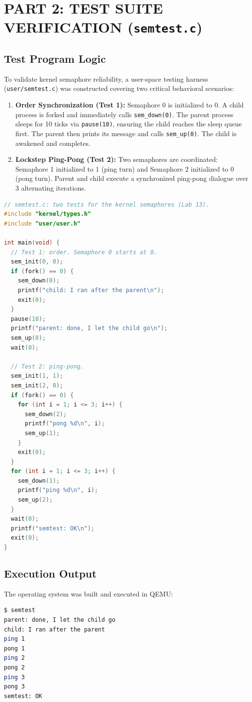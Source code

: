 \documentclass[12pt,a4paper]{report}
\numberwithin{equation}{chapter}
\numberwithin{figure}{chapter}
\numberwithin{table}{chapter}
\begin{document}
\chapter{PART 2: TEST SUITE VERIFICATION (\texttt{semtest.c})}

\section{Test Program Logic}
To validate kernel semaphore reliability, a user-space testing harness (\texttt{user/semtest.c}) was constructed covering two critical behavioral scenarios:
\begin{enumerate}
    \item \textbf{Order Synchronization (Test 1):} Semaphore 0 is initialized to 0. A child process is forked and immediately calls \texttt{sem\_down(0)}. The parent process sleeps for 10 ticks via \texttt{pause(10)}, ensuring the child reaches the sleep queue first. The parent then prints its message and calls \texttt{sem\_up(0)}. The child is awakened and completes.
    \item \textbf{Lockstep Ping-Pong (Test 2):} Two semaphores are coordinated: Semaphore 1 initialized to 1 (ping turn) and Semaphore 2 initialized to 0 (pong turn). Parent and child execute a synchronized ping-pong dialogue over 3 alternating iterations.
\end{enumerate}

\begin{lstlisting}[language=C]
// semtest.c: two tests for the kernel semaphores (Lab 13).
#include "kernel/types.h"
#include "user/user.h"

int main(void) {
  // Test 1: order. Semaphore 0 starts at 0.
  sem_init(0, 0);
  if (fork() == 0) {
    sem_down(0);
    printf("child: I ran after the parent\n");
    exit(0);
  }
  pause(10);
  printf("parent: done, I let the child go\n");
  sem_up(0);
  wait(0);

  // Test 2: ping-pong.
  sem_init(1, 1);
  sem_init(2, 0);
  if (fork() == 0) {
    for (int i = 1; i <= 3; i++) {
      sem_down(2);
      printf("pong %d\n", i);
      sem_up(1);
    }
    exit(0);
  }
  for (int i = 1; i <= 3; i++) {
    sem_down(1);
    printf("ping %d\n", i);
    sem_up(2);
  }
  wait(0);
  printf("semtest: OK\n");
  exit(0);
}
\end{lstlisting}

\section{Execution Output}
The operating system was built and executed in QEMU:
\begin{lstlisting}[language=bash]
$ semtest
parent: done, I let the child go
child: I ran after the parent
ping 1
pong 1
ping 2
pong 2
ping 3
pong 3
semtest: OK
\end{lstlisting}
\end{document}
